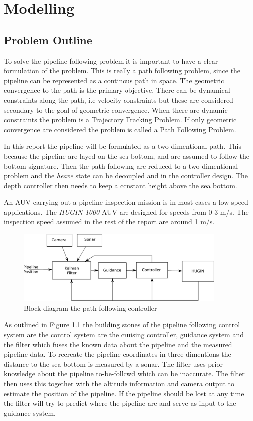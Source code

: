 \chapter{Modelling}

\section{Problem Outline}
\label{chap2:problem}
	To solve the pipeline following problem it is important to have a clear formulation of the problem.
	This is really a path following problem, since the pipeline can be represented as a continous path in
	space. The geometric convergence to the path is the primary objective. There can be dynamical
	constraints along the path, i.e velocity constraints but these are considered secondary to the goal of
	geometric convergence. When there are dynamic constraints the problem is a Trajectory Tracking
	Problem. If only geometric convergence are considered the problem is called a Path Following Problem.
	\cite{guidance-path-2d-3d}

	In this report the pipeline will be formulated as a two dimentional path. This because the pipeline
	are layed on the sea bottom, and are assumed to follow the bottom signature. Then the path following
	are reduced to a two dimentional problem and the \textit{heave} state can be decoupled and in the
	controller design. The depth controller then needs to keep a constant height above the sea bottom.

	An AUV carrying out a pipeline inspection mission is in most cases a low speed applications. The
	\textit{HUGIN 1000} AUV are designed for speeds from 0-3 m/s. The inspection speed assumed in the
	rest of the report are around 1 m/s.

	\begin{figure}[hbtp]
		\centering
		\includegraphics[width=0.9\textwidth]{pics/blockdiagram}
		\caption{Block diagram the path following controller}
		\label{fig:ch2-blockdiagram}
	\end{figure}
	As outlined in Figure \ref{fig:ch2-blockdiagram} the building stones of the  pipeline following
	control system are the control system are the cruising controller, guidance system and the filter
	which fuses the known data about the pipeline and the measured pipeline data. To recreate the 
	pipeline coordinates in three dimentions the distance to the sea bottom is measured by a sonar. The
	filter uses prior knowledge about the pipeline to-be-followd which can be inaccurate. The filter then
	uses this together with the altitude information and camera output to estimate the position of the
	pipeline. If the pipeline should be lost at any time the filter will try to predict where the pipeline
	are and serve as input to the guidance system.

